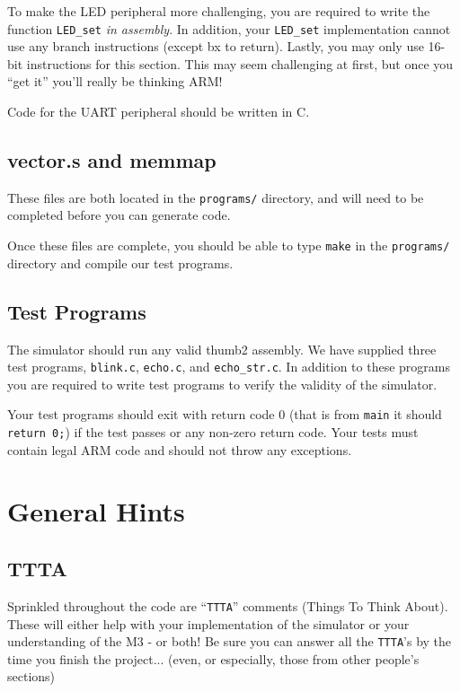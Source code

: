 \documentclass{article}
\begin{document}
To make the LED peripheral more challenging, you are required to write the
function {\tt LED\_set} {\em in assembly}. In addition, your {\tt LED\_set}
implementation cannot use any branch instructions (except bx to return).
Lastly, you may only use 16-bit instructions for this section. This may seem
challenging at first, but once you ``get it'' you'll really be thinking ARM!

Code for the UART peripheral should be written in C.

\subsection{vector.s and memmap}

These files are both located in the {\tt programs/} directory, and will need
to be completed before you can generate code.

Once these files are complete, you should be able to type {\tt make} in the
{\tt programs/} directory and compile our test programs.

\subsection{Test Programs}

The simulator should run any valid thumb2 assembly. We have supplied three
test programs, {\tt blink.c}, {\tt echo.c}, and {\tt echo\_str.c}. In addition
to these programs you are required to write test programs to verify the
validity of the simulator.

Your test programs should exit with return code 0 (that is from {\tt main} it
should {\tt return 0;}) if the test passes or any non-zero return code. Your
tests must contain legal ARM code and should not throw any exceptions.

\section{General Hints}

\subsection{TTTA}
Sprinkled throughout the code are ``{\tt TTTA}'' comments (Things To Think
About).  These will either help with your implementation of the simulator or
your understanding of the M3 - or both! Be sure you can answer all the
{\tt TTTA}'s by the time you finish the project... (even, or especially, those
from other people's sections)
\end{document}

